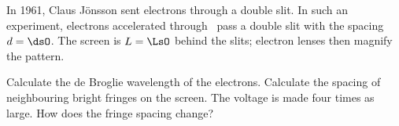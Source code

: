 In 1961, Claus Jönsson sent electrons through a double slit. In such an experiment, electrons accelerated through \UO\ pass a double slit with the spacing $d = \dsO$. The screen is $L = \LsO$ behind the slits; electron lenses then magnify the pattern.

\begin{abcliste}
\abc Calculate the de Broglie wavelength of the electrons.
\abc Calculate the spacing of neighbouring bright fringes on the screen.
\abc The voltage is made four times as large. How does the fringe spacing change?
\end{abcliste}
